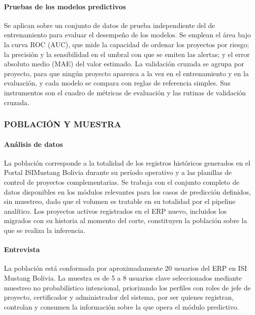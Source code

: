 \paragraph{Pruebas de los modelos predictivos}

Se aplican sobre un conjunto de datos de prueba independiente del de entrenamiento para evaluar el desempeño de los modelos. Se emplean el área bajo la curva ROC (AUC), que mide la capacidad de ordenar los proyectos por riesgo; la precisión y la sensibilidad en el umbral con que se emiten las alertas; y el error absoluto medio (MAE) del valor estimado. La validación cruzada se agrupa por proyecto, para que ningún proyecto aparezca a la vez en el entrenamiento y en la evaluación, y cada modelo se compara con reglas de referencia simples. Sus instrumentos son el cuadro de métricas de evaluación y las rutinas de validación cruzada.

\subsubsection{POBLACIÓN Y MUESTRA}

\paragraph{Análisis de datos}

La población corresponde a la totalidad de los registros históricos generados en el Portal ISIMustang Bolivia durante su período operativo y a las planillas de control de proyectos complementarias. Se trabaja con el conjunto completo de datos disponibles en los módulos relevantes para los casos de predicción definidos, sin muestreo, dado que el volumen es tratable en su totalidad por el pipeline analítico. Los proyectos activos registrados en el ERP nuevo, incluidos los migrados con su historia al momento del corte, constituyen la población sobre la que se realiza la inferencia.

\paragraph{Entrevista}

La población está conformada por aproximadamente 20 usuarios del ERP en ISI Mustang Bolivia. La muestra es de 5 a 8 usuarios clave seleccionados mediante muestreo no probabilístico intencional, priorizando los perfiles con roles de jefe de proyecto, certificador y administrador del sistema, por ser quienes registran, controlan y consumen la información sobre la que opera el módulo predictivo.

